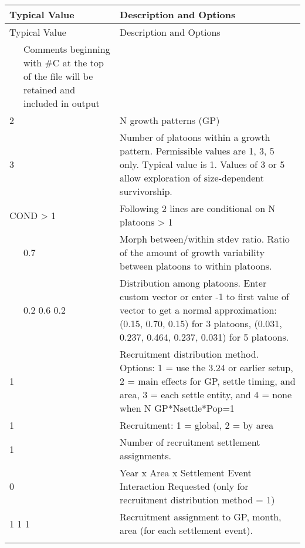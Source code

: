 \begin{center}

	\begin{longtable}{p{0.5cm} p{2cm} p{12cm}}

		\multicolumn{2}{l}{Typical Value} & Description and Options\\
		\hline
		\endfirsthead

		\multicolumn{2}{l}{Typical Value} & Description and Options\\
		\hline
		\endhead

		\hline
		\endfoot

		\endlastfoot

		\multicolumn{2}{l}{\#C comment } & Comments beginning with \#C at the top of the file will be retained and included in output  \\
		\hline

		2 & & N growth patterns (GP)  \\

		3 & & Number of platoons within a growth pattern. Permissible values are 1, 3, 5 only.  Typical value is 1.  Values of 3 or 5 allow exploration of size-dependent survivorship. \\
		\hline

		\multicolumn{2}{l}{COND > 1}& \multicolumn{1}{l}{\parbox{12cm}{Following 2 lines are conditional on N platoons > 1}} \\

		& 0.7 & Morph between/within stdev ratio. Ratio of the amount of growth variability between platoons to within platoons.\\

		& 0.2 0.6 0.2 & Distribution among platoons. Enter custom vector or enter -1 to first value of vector to get a normal approximation: (0.15, 0.70, 0.15) for 3 platoons, (0.031, 0.237, 0.464, 0.237, 0.031) for 5 platoons.\\
		\hline

		1 & & Recruitment distribution method.  Options: 1 = use the 3.24 or earlier setup, 2 = main effects for GP, settle timing, and area, 3 = each settle entity, and 4 = none when N GP*Nsettle*Pop=1\\

		1 & & Recruitment: 1 = global, 2 = by area\\
		1 & & Number of recruitment settlement assignments.\\
		0 & & Year x Area x Settlement Event Interaction Requested (only for recruitment distribution method = 1)\\
		\multicolumn{2}{l}{1 1 1}& \multicolumn{1}{l}{\multirow{1}{12cm}[-0.1cm]{\parbox{12.5cm}{Recruitment assignment to GP, month, area (for each settlement event).}}}\\
		\\
		\hline	


\end{longtable}
\end{center}
